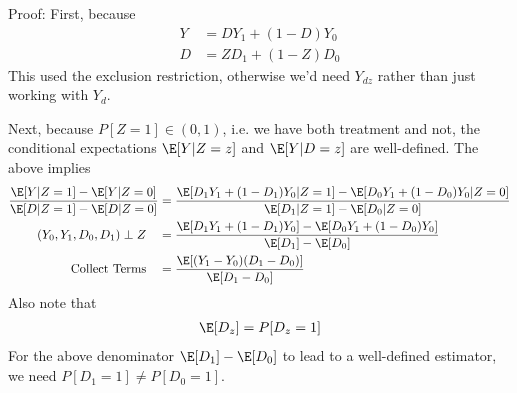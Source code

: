 \documentclass[12pt]{article}
\theoremstyle{plain}
\theoremstyle{definition}
\theoremstyle{remark}
\begin{document}
Proof:
First, because
\begin{align*}
  Y &= DY_1 + (1-D)Y_0
  \\
  D &= ZD_1 + (1-Z)D_0
\end{align*}
This used the exclusion restriction, otherwise we'd need $Y_{dz}$
rather than just working with $Y_{d}$.

Next, because $P[Z=1]\in (0,1)$, i.e. we have both treatment and
not, the conditional expectations  $\E[Y|Z=z]$ and $\E[Y|D=z]$ are
well-defined.
The above implies
\begin{align*}
  \frac{\E[Y|Z=1]-\E[Y|Z=0]}{\E[D|Z=1]-\E[D|Z=0]}
  &=
  \frac{%
    \E[D_1Y_1 + (1-D_1)Y_0|Z=1]-\E[D_0Y_1 + (1-D_0)Y_0|Z=0]
  }{\E[D_1|Z=1]-\E[D_0|Z=0]}
  \\
  (Y_0,Y_1,D_0,D_1)\perp Z
  \quad
  &=
  \frac{%
    \E[D_1Y_1 + (1-D_1)Y_0]-\E[D_0Y_1 + (1-D_0)Y_0]
  }{\E[D_1]-\E[D_0]}
  \\
  \text{Collect Terms}
  \quad
  &=
  \frac{%
    \E[(Y_1-Y_0)(D_1-D_0)]
  }{\E[D_1-D_0]}
\end{align*}
Also note that
\begin{align*}
  \E[D_z]
  =
  P[D_z=1]
\end{align*}
For the above denominator $\E[D_1]-\E[D_0]$ to lead to a
well-defined estimator, we need $P[D_1=1]\neq P[D_0=1]$.
\end{document}
